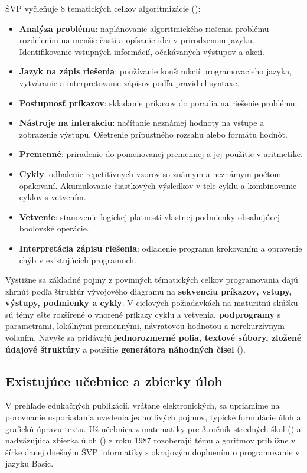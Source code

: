 ŠVP vyčleňuje 8 tematických celkov algoritmizácie (\cite{statny_2023}):
\begin{itemize}[noitemsep,topsep=0pt]
\item \textbf{Analýza problému}: naplánovanie algoritmického riešenia problému rozdelením na menšie časti a opísanie idei v prirodzenom jazyku. Identifikovanie vstupných informácií, očakávaných výstupov a akcií. 
\item \textbf{Jazyk na zápis riešenia}: používanie konštrukcií programovacieho jazyka, vytváranie a interpretovanie zápisov podľa pravidiel syntaxe.
\item \textbf{Postupnosť príkazov}: skladanie príkazov do poradia na riešenie problému.
\item \textbf{Nástroje na interakciu}: načítanie neznámej hodnoty na vstupe a zobrazenie výstupu. Ošetrenie prípustného rozsahu alebo formátu hodnôt.
\item \textbf{Premenné}: priradenie do pomenovanej premennej a jej použitie v aritmetike.
\item \textbf{Cykly}: odhalenie repetitívnych vzorov so známym a neznámym počtom opakovaní. Akumulovanie čiastkových výsledkov v tele cyklu a kombinovanie cyklov s vetvením.
\item \textbf{Vetvenie}: stanovenie logickej platnosti vlastnej podmienky obsahujúcej boolovské operácie.
\item \textbf{Interpretácia zápisu riešenia}: odladenie programu krokovaním a opravenie chýb v existujúcich programoch.
\end{itemize}

Výstižne sa základné pojmy z povinných tématických celkov programovania dajú zhrnúť podľa štruktúr vývojového diagramu na \textbf{sekvenciu príkazov, vstupy, výstupy, podmienky a cykly}. V cieľových požiadavkách na maturitnú skúšku sú témy ešte rozšírené o vnorené príkazy cyklu a vetvenia, \textbf{podprogramy} s parametrami, lokálnými premennými, návratovou hodnotou a nerekurzívnym volaním. Navyše sa pridávajú \textbf{jednorozmerné polia, textové súbory, zložené údajové štruktúry} a použitie \textbf{generátora náhodných čísel} (\cite{cp_2023}).

\subsection{Existujúce učebnice a zbierky úloh}
V prehľade edukačných publikácií, vrátane elektronických, sa upriamime na porovnanie usporiadania uvedenia jednotlivých pojmov, typické formulácie úloh a grafickú úpravu textu. Už učebnica z matematiky pre 3.ročník stredných škol (\cite{sedivy_matematika_1986}) a nadväzujúca zbierka úloh (\cite{busek_zbierka_1987}) z roku 1987 rozoberajú tému algoritmov približne v šírke danej dnešným ŠVP informatiky s okrajovým doplnením o programovanie v jazyku Basic. 

